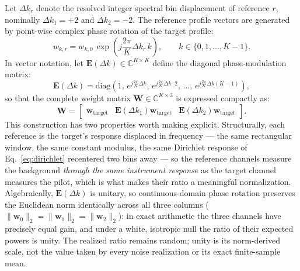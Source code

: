 Let $\Delta k_r$ denote the resolved integer spectral bin displacement of reference $r$, nominally $\Delta k_1 = +2$ and $\Delta k_2 = -2$. The reference profile vectors are generated by point-wise complex phase rotation of the target profile:
\begin{equation}
w_{k, r} = w_{k, 0} \, \exp\left(j \frac{2\pi}{K} \Delta k_r \, k\right), \qquad k \in \{0, 1, \dots, K-1\}.
\end{equation}
In vector notation, let $\mathbf{E}(\Delta k) \in \mathbb{C}^{K \times K}$ define the diagonal phase-modulation matrix:
\begin{equation}
\mathbf{E}(\Delta k) = \text{diag}\left( 1, \, e^{j \frac{2\pi}{K} \Delta k}, \, e^{j \frac{2\pi}{K} \Delta k \cdot 2}, \, \dots, \, e^{j \frac{2\pi}{K} \Delta k (K-1)} \right),
\end{equation}
so that the complete weight matrix $\mathbf{W} \in \mathbb{C}^{K \times 3}$ is expressed compactly as:
\begin{equation}
\mathbf{W} = \begin{bmatrix}
\mathbf{w}_{\text{target}} & \mathbf{E}(\Delta k_1)\mathbf{w}_{\text{target}} & \mathbf{E}(\Delta k_2)\mathbf{w}_{\text{target}}
\end{bmatrix}.
\end{equation}
This construction has two properties worth making explicit. Structurally, each reference is the target's response displaced in frequency --- the same rectangular window, the same constant modulus, the same Dirichlet response of Eq.~\eqref{eq:dirichlet} recentered two bins away --- so the reference channels measure the background \emph{through the same instrument response} as the target channel measures the pilot, which is what makes their ratio a meaningful normalization. Algebraically, $\mathbf{E}(\Delta k)$ is unitary, so continuous-domain phase rotation preserves the Euclidean norm identically across all three columns ($\|\mathbf{w}_0\|_2 = \|\mathbf{w}_1\|_2 = \|\mathbf{w}_2\|_2$): in exact arithmetic the three channels have precisely equal gain, and under a white, isotropic null the ratio of their expected powers is unity. The realized ratio remains random; unity is its norm-derived scale, not the value taken by every noise realization or its exact finite-sample mean.

